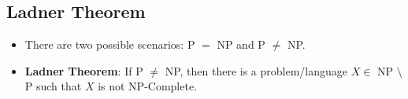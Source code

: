 \documentclass[12pt]{article}
\begin{document}
\subsection{Ladner Theorem}
\begin{itemize}
    \item There are two possible scenarios: P $=$ NP and P $\neq$ NP.
    \item \textbf{Ladner Theorem}: If P $\neq$ NP, then there is a problem/language $X \in$ NP $\setminus$ P such that $X$ is not NP-Complete.
\end{itemize}
\end{document}
